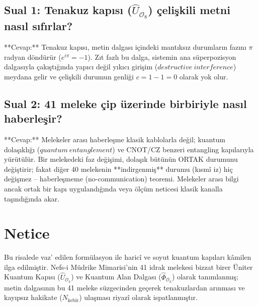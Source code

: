 \documentclass[11pt, a4paper]{article}
\begin{document}
\subsection{Sual 1: Tenakuz kapısı ($\hat{U}_{\mathcal{O}_8}$) çelişkili metni nasıl sıfırlar?}
**Cevap:** Tenakuz kapısı, metin dalgası içindeki mantıksız durumların fazını $\pi$ radyan döndürür ($e^{i\pi} = -1$). Zıt fazlı bu dalga, sistemin ana süperpozisyon dalgasıyla çakıştığında yapıcı değil yıkıcı girişim ($destructive\ interference$) meydana gelir ve çelişkili durumun genliği $c = 1 - 1 = 0$ olarak yok olur.

\subsection{Sual 2: 41 meleke çip üzerinde birbiriyle nasıl haberleşir?}
**Cevap:** Melekeler arası haberleşme klasik kablolarla değil; kuantum dolaşıklığı ($quantum\ entanglement$) ve CNOT/CZ benzeri entangling kapılarıyla yürütülür. Bir melekedeki faz değişimi, dolaşık bütünün ORTAK durumunu değiştirir; fakat diğer 40 melekenin **indirgenmiş** durumu (kısmî iz) hiç değişmez -- haberleşmeme (no-communication) teoremi. Melekeler arası bilgi ancak ortak bir kapı uygulandığında veya ölçüm neticesi klasik kanalla taşındığında akar.

\section{Netice}

Bu risalede vaz' edilen formülasyon ile haricî ve soyut kuantum kapıları kâmilen ilga edilmiştir. Nefs-i Müdrike Mimarisi'nin 41 idrak melekesi bizzat birer Üniter Kuantum Kapısı ($\hat{U}_{\mathcal{O}_k}$) ve Kuantum Alan Dalgası ($\hat{\Phi}_{\mathcal{O}_k}$) olarak tanımlanmış; metin dalgasının bu 41 meleke süzgecinden geçerek tenakuzlardan arınması ve kayıpsız hakikate ($N_{\text{kebîr}}$) ulaşması riyazî olarak ispatlanmıştır.
\end{document}

